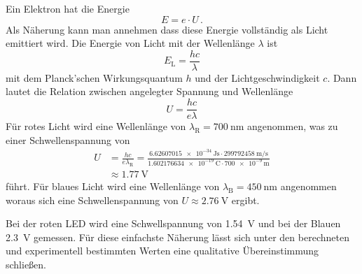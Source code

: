 \documentclass[
12pt,
a4paper,
bibliography=totocnumbered, %
BCOR=1cm, %
oneside, %
]{scrartcl}
\begin{document}
Ein Elektron hat die Energie
\begin{equation*}
	E = e \cdot U \,.
\end{equation*}
Als Näherung kann man annehmen dass diese Energie vollständig als Licht emittiert wird. Die Energie von Licht mit der Wellenlänge \(\lambda\) ist
\begin{equation*}
	E_{\text{L}} = \frac{hc}{\lambda}
\end{equation*}
mit dem Planck'schen Wirkungsquantum \(h\) und der Lichtgeschwindigkeit \(c\).
Dann lautet die Relation zwischen angelegter Spannung und Wellenlänge
\begin{equation*}
	U = \frac{hc}{e\lambda}
\end{equation*}
Für rotes Licht wird eine Wellenlänge von \(\lambda_{\text{R}} = \qty{700}{\nano\meter}\) angenommen, was zu einer Schwellenspannung von
\begin{align*}
	U &= \frac{hc}{e\lambda_{\text{R}}} = \frac{\qty{6,62607015e-34}{\joule\second} \cdot \qty{299792458}{\meter\per\second}}{\qty{1,602176634e-19}{\coulomb} \cdot \qty{700e-9}{\meter}}\\
	&\approx \qty{1,77}{\volt}
\end{align*}
führt.
Für blaues Licht wird eine Wellenlänge von \(\lambda_{\text{B}} = \qty{450}{\nano\meter}\) angenommen woraus sich eine Schwellenspannung von \(U \approx \qty{2,76}{\volt}\) ergibt.

Bei der roten LED wird eine Schwellspannung von \qty{1,54}{\volt} und bei der Blauen \qty{2,3}{\volt} gemessen. Für diese einfachste Näherung lässt sich unter den berechneten und experimentell bestimmten Werten eine qualitative Übereinstimmung schließen.
\end{document}
